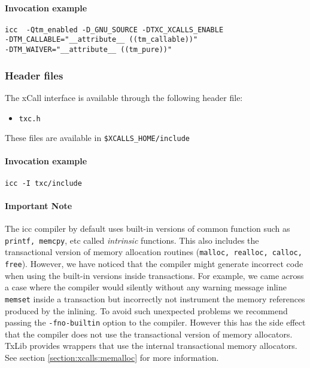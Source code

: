 \paragraph{Invocation example}
\begin{verbatim}
icc  -Qtm_enabled -D_GNU_SOURCE -DTXC_XCALLS_ENABLE 
-DTM_CALLABLE="__attribute__ ((tm_callable))" 
-DTM_WAIVER="__attribute__ ((tm_pure))" 
\end{verbatim}

\subsubsection{Header files}
The xCall interface is available through the following header file:
\begin{itemize}
\item \verb!txc.h!
\end{itemize}

\noindent These files are available in 
\verb!$XCALLS_HOME/include!

\paragraph{Invocation example}
\begin{verbatim}
icc -I txc/include
\end{verbatim}

\paragraph{Important Note} The icc compiler by default uses built-in versions
of common function such as {\tt printf, memcpy}, etc called {\em intrinsic} functions. 
This also includes the transactional version of memory allocation routines 
({\tt malloc, realloc, calloc, free}).
However, we have noticed that the compiler might generate incorrect code when 
using the built-in versions inside transactions. For example, we came across
a case where the compiler would silently without any warning message inline 
{\tt memset} inside a transaction but incorrectly
not instrument the memory references produced by the inlining. 
To avoid such unexpected problems we recommend passing the {\tt -fno-builtin} option
to the compiler. However this has the side effect that the compiler does not use
the transactional version of memory allocators. TxLib provides wrappers that use 
the internal transactional memory allocators. See section \ref{section:xcalls:memalloc} 
for more information.      
